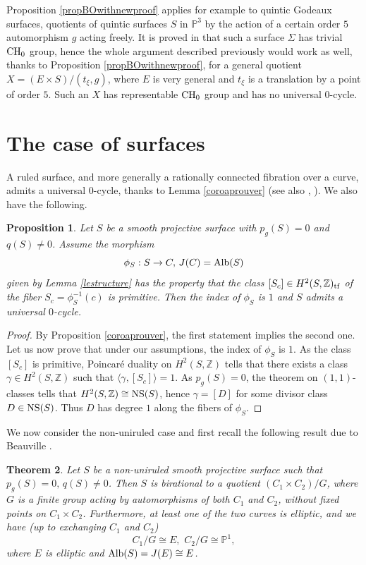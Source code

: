 \documentclass[10pt]{article}
\newtheorem{theo}{Theorem}[section]
\newtheorem{prop}[theo]{Proposition}
\begin{document}
Proposition \ref{propBOwithnewproof} applies for example to quintic  Godeaux surfaces, quotients of quintic surfaces $S$ in $\mathbb{P}^3$ by the  action of a certain  order $5$ automorphism $g$ acting freely. It is proved in  \cite{voisingodeaux} that such a surface $\Sigma$ has trivial ${\rm CH}_0$ group, hence the whole argument described previously would work as well, thanks to Proposition \ref{propBOwithnewproof}, for a general quotient $X=(E\times S)/(t_\xi,g)$, where $E$ is very general and  $t_\xi$ is a translation by a point of order $5$. Such an $X$ has representable ${\rm CH}_0$ group and has no universal $0$-cycle.

\section{The case of surfaces\label{secsurfcaes} }
A ruled surface, and more generally a rationally connected fibration over a curve,  admits a universal $0$-cycle, thanks to Lemma \ref{coroaprouver} (see also  \cite{colliotTh}, \cite{voisinArbarello}). We also have the following.
\begin{prop} \label{propsourface} Let $S$ be a smooth projective surface with $p_g(S)=0$ and $q(S)\not=0$.  Assume the morphism
$$\phi_S:S\rightarrow C,\,J(C)={\rm Alb}(S)$$ given by Lemma \ref{lestructure} has the property that the class
$[S_c]\in H^2(S,\mathbb{Z})_{\rm tf}$ of the fiber $S_c=\phi_S^{-1}(c)$ is primitive. Then the index of $\phi_S$ is $1$ and  $S$ admits a universal $0$-cycle.
\end{prop}
\begin{proof} By Proposition \ref{coroaprouver}, the first statement implies the second one.  Let us now prove that under our assumptions, the index of $\phi_S$ is $1$.  As the class $[S_c]$ is primitive, Poincar\'{e} duality on $H^2(S,\mathbb{Z})$ tells that there exists a class $\gamma\in H^2(S,\mathbb{Z})$ such that $\langle \gamma,[S_c]\rangle=1$. As $p_g(S)=0$, the  theorem on $(1,1)$-classes tells that $H^2(S,\mathbb{Z})\cong {\rm NS}(S)$, hence $\gamma=[D]$ for some divisor class $D \in {\rm NS}(S)$. Thus $D$ has degree $1$ along the fibers of $\phi_S$.
\end{proof}
We now consider the non-uniruled case and  first recall the following result due to Beauville \cite{beauville}.
\begin{theo} \label{theobeau} \cite[Proposition 11]{beauville} Let $S$ be a non-uniruled smooth projective surface such that $p_g(S)=0,\,q(S)\not=0$. Then $S$ is birational to a quotient $(C_1\times C_2)/G$, where $G$ is a finite group acting by automorphisms of both $C_1$ and $C_2$, without fixed points on $C_1\times C_2$. Furthermore, at least one of the two curves is elliptic, and we have (up to exchanging $C_1$ and $C_2$)
$$ C_1/G\cong E,\,\,C_2/G\cong \mathbb{P}^1,$$
where $E$ is elliptic and ${\rm Alb}(S)=J(E)\cong E$.
\end{theo}
\end{document}
